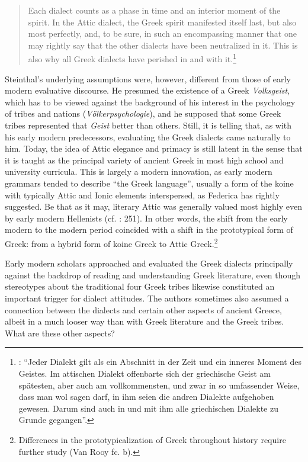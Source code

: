 \begin{quote}
Each dialect counts as a phase in time and an interior moment of the spirit. In the Attic dialect, the Greek spirit manifested itself last, but also most perfectly, and, to be sure, in such an encompassing manner that one may rightly say that the other dialects have been neutralized in it. This is also why all Greek dialects have perished in and with it.\footnote{\citet[9]{Steinthal1891}: “Jeder Dialekt gilt als ein Abschnitt in der Zeit und ein inneres Moment des Geistes. Im attischen Dialekt offenbarte sich der griechische Geist am spätesten, aber auch am vollkommensten, und zwar in so umfassender Weise, dass man wol sagen darf, in ihm seien die andren Dialekte aufgehoben gewesen. Darum sind auch in und mit ihm alle griechischen Dialekte zu Grunde gegangen”.}
\end{quote}

Steinthal’s underlying assumptions were, however, different from those of early modern evaluative discourse. He presumed the existence of a Greek \textit{Volksgeist}, which has to be viewed against the background of his interest in the psychology of tribes and nations (\textit{Völkerpsychologie}), and he supposed that some Greek tribes represented that \textit{Geist} better than others. Still, it is telling that, as with his early modern predecessors, evaluating the Greek dialects came naturally to him. Today, the idea of Attic elegance and primacy is still latent in the sense that it is taught as the principal variety of ancient Greek in most high school and university curricula. This is largely a modern innovation, as early modern grammars tended to describe “the Greek language”, usually a form of the koine with typically Attic and Ionic elements interspersed, as Federica \citet[123]{Ciccolella2008} has rightly suggested. Be that as it may, literary Attic was generally valued most highly even by early modern Hellenists (cf. \citealt{Roelcke2014}: 251). In other words, the shift from the early modern to the modern period coincided with a shift in the prototypical form of Greek: from a hybrid form of koine Greek to Attic Greek.\footnote{Differences in the prototypicalization of Greek throughout history require further study (Van Rooy fc. b).}

Early modern scholars approached and evaluated the Greek dialects principally against the backdrop of reading and understanding Greek literature, even though stereotypes about the traditional four Greek tribes likewise constituted an important trigger for dialect attitudes. The authors sometimes also assumed a connection between the dialects and certain other aspects of ancient Greece, albeit in a much looser way than with Greek literature and the Greek tribes. What are these other aspects?

